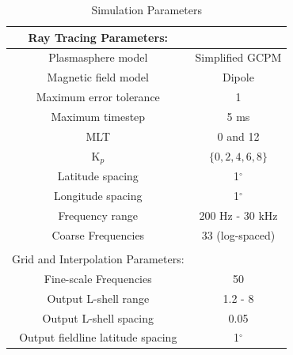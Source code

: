 \begin{table}[h!]
\caption{Simulation Parameters}
\begin{center}

\begin{tabular}{c|c}
Ray Tracing Parameters: & \\
\hline \hline
Plasmasphere model & Simplified GCPM \\
Magnetic field model & Dipole \\
Maximum error tolerance & 1\E{-3} \\
Maximum timestep & 5 ms \\
MLT & 0 and 12 \\
K$_p$ & $\{0, 2, 4, 6, 8\}$ \\
Latitude spacing & 1$^\circ$ \\
Longitude spacing & 1$^\circ$ \\
Frequency range & 200 Hz - 30 kHz \\
Coarse Frequencies & 33 (log-spaced) \\
& \\
Grid and Interpolation Parameters: \\
\hline \hline
Fine-scale Frequencies & 50 \\
Output L-shell range & 1.2 - 8 \\
Output L-shell spacing & 0.05 \\
Output fieldline latitude spacing & 1$^\circ$ \\
\end{tabular}
%
\end{center}
\label{tab:simulation_params}
\end{table}%

